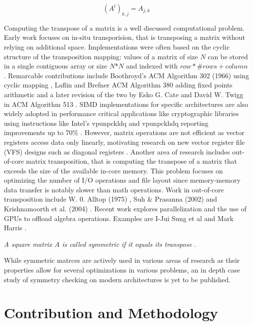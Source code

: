 \documentclass[conference]{IEEEtran}
\begin{document}
\begin{equation}
	(A^t)_{k,j} = A_{j,k}
\end{equation}

Computing the transpose of a matrix is a well discussed computational problem. Early
work focuses on in-situ transporision, that is transposing a matrix without
relying on additional space. Implementations were often based on the cyclic
structure of the transposition mapping: values of a matrix of size $N$ can be stored
in a single contiguous array or size $N$*$N$ and indexed with $row*\#rows+ column$.
Remarcable contributions include Boothroyd's ACM Algorithm 302 (1966) using cyclic mapping \cite{b13}, Laflin and Brefner ACM Algorithm 380
adding fixed points arithmetic \cite{b14} and
a later revision of the two by Esko G. Cate and David W. Twigg in ACM Algorithm 513 \cite{b15} .
SIMD implementations for specific architectures are also widely adopted
in performance critical applications like cryptographic libraries using instructions like Intel's vpunpckldq and vpunpckhdq \cite{b16} reporting improvements up to 70\% \cite{b17}.
However, matrix operations are not efficient as vector registers access data only linearly, motivating research on new vector register file (VFS) designs such as diagonal registers \cite{b23}.
Another area of research includes out-of-core matrix transposition, that
is computing the transpose of a matrix that exceeds the size of the available in-core memory.
This problem focuses on optimizing the number of I/O operations and file layout since memory-memory data transfer is notably slower than math operations. Work in out-of-core transposition include W. 0. Alltop (1975) \cite{b18}, Suh \& Prasanna (2002) \cite{b19} and Krishnamoorth et al. (2004) \cite{b20}.
Recent work explores parallelization and the use of GPUs to offload algebra operations. Examples are I-Jui Sung et al \cite{b21} and Mark Harris \cite{b22}.


\textit{A square matrix $A$ is called symmetric if it equals its transpose} \cite{b12}.

While symmetric matrces are actively used in various areas of research as their
properties allow for several optimizations in various problems, an in depth case study of symmetry
checking on modern architectures is yet to be published.

\section{Contribution and Methodology}
\end{document}
